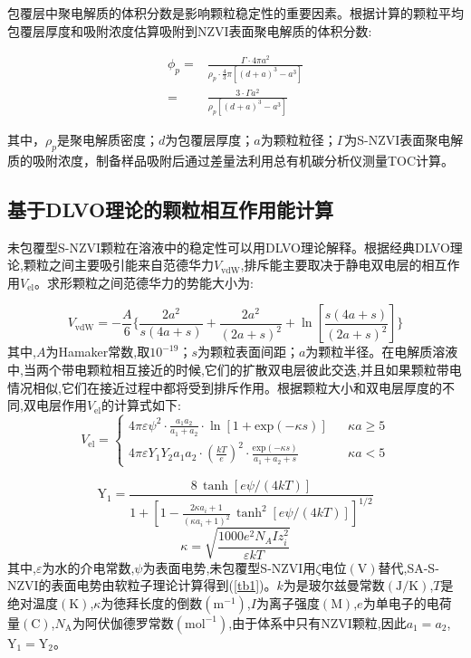包覆层中聚电解质的体积分数是影响颗粒稳定性的重要因素。根据计算的颗粒平均包覆层厚度和吸附浓度估算吸附到NZVI表面聚电解质的体积分数:

\begin{align}
    \phi_p=& \frac{\Gamma\cdot 4\pi a^2}{\rho_p\cdot \frac{4}{3}\pi [(d+a)^3-a^3]}  \\
    =&\frac{3\cdot\Gamma a^2}{\rho_p[(d+a)^3-a^3]} \nonumber
\end{align}

其中，$\rho_p$是聚电解质密度；$d$为包覆层厚度；$a$为颗粒粒径；$\Gamma$为S-NZVI表面聚电解质的吸附浓度，制备样品吸附后通过差量法利用总有机碳分析仪测量TOC计算。


\subsection{基于DLVO理论的颗粒相互作用能计算}

未包覆型S-NZVI颗粒在溶液中的稳定性可以用DLVO理论解释\cite{gregory1981approximate,bian2011aggregation}。根据经典DLVO理论,颗粒之间主要吸引能来自范德华力$V_\mathrm{vdW}$,排斥能主要取决于静电双电层的相互作用$V_\mathrm{el}$。求形颗粒之间范德华力的势能大小为\cite{huynh2011aggregation}:

\begin{equation}
    V_{\mathrm {vdW}}=-\frac{A}{6}\{\frac{2a^2}{s(4a+s)}+\frac{2a^2}{(2a+s)^2}+\ln[\frac{s(4a+s)}{(2a+s)^2}]\}
\end{equation}
其中,$A$为Hamaker常数,取$10^{-19}$；$s$为颗粒表面间距；$a$为颗粒半径。在电解质溶液中,当两个带电颗粒相互接近的时候,它们的扩散双电层彼此交迭,并且如果颗粒带电情况相似,它们在接近过程中都将受到排斥作用。根据颗粒大小和双电层厚度的不同,双电层作用$V_{\mathrm{el}}$的计算式如下\cite{bian2011aggregation,noh2010fluorescence,OHSHIMA199545}:
\begin{equation}
    V_{\mathrm{el}}=\left\{
        \begin{array}{lcl}
            4\pi \varepsilon \psi^2\cdot\frac{a_1a_2}{a_1+a_2}\cdot\ln[1+{\mathrm {exp}}(-\kappa s)]& &{\kappa a \geqslant  5}\\
            4\pi \varepsilon Y_1Y_2a_1a_2\cdot(\frac{kT}{e})^2\cdot\frac{{\mathrm {exp}}(-\kappa s)}{a_1+a_2+s}& &{\kappa a < 5}
        \end{array}\right.
\end{equation}

\begin{equation}
    \mathrm{Y_1}=\frac{8\, \tanh[e\psi /(4kT)]}{1+[1-\frac{2\kappa a_i+1}{(\kappa a_i +1)^2} \, \tanh^2[e\psi/(4kT)]] ^{1/2}} 
\end{equation}
\begin{equation}
    \kappa =\sqrt{\frac{1000 e^2 N_A I z_i^2}{\varepsilon k T}}
\end{equation}
其中,$\varepsilon$为水的介电常数,$\psi$为表面电势,未包覆型S-NZVI用$\zeta$电位$(\mathrm V)$替代\cite{wu2013aggregation,bhardwaj2010self,feriancikova2012deposition},SA-S-NZVI的表面电势由软粒子理论计算得到(\cref{tb1})。$k$为是玻尔兹曼常数$(\mathrm {J/K})$,$T$是绝对温度$\mathrm {(K)}$,$\kappa$为徳拜长度的倒数$(\mathrm m^{-1})$,$I$为离子强度$(\mathrm M)$,$e$为单电子的电荷量$\mathrm {(C)}$,$N_\mathrm{A}$为阿伏伽德罗常数$(\mathrm {mol^{-1}})$,由于体系中只有NZVI颗粒,因此$a_1=a_2$,$\mathrm{Y_1=Y_2}$。

